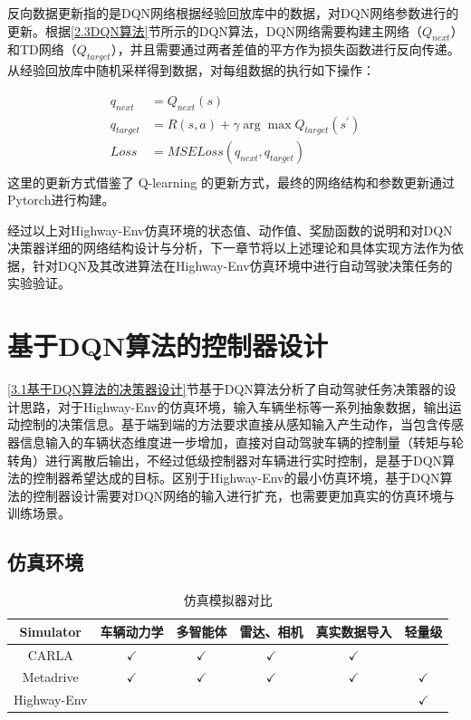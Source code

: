 反向数据更新指的是DQN网络根据经验回放库中的数据，对DQN网络参数进行的更新。根据\ref{2.3DQN算法}节所示的DQN算法，DQN网络需要构建主网络（$Q_{next}$）和TD网络（$Q_{target}$），并且需要通过两者差值的平方作为损失函数进行反向传递。从经验回放库中随机采样得到数据，对每组数据的执行如下操作：

\begin{equation}
    \begin{aligned}
        q_{next} &= Q_{next}(s)\\
        q_{target} &= R(s,a) + \gamma \arg \max Q_{target}(s^{'})\\
        Loss &= MSELoss(q_{next},q_{target})\\
    \end{aligned}
\end{equation}
这里的更新方式借鉴了 Q-learning 的更新方式，最终的网络结构和参数更新通过Pytorch进行构建。

经过以上对Highway-Env仿真环境的状态值、动作值、奖励函数的说明和对DQN决策器详细的网络结构设计与分析，下一章节将以上述理论和具体实现方法作为依据，针对DQN及其改进算法在Highway-Env仿真环境中进行自动驾驶决策任务的实验验证。

\section{基于DQN算法的控制器设计} %

\ref{3.1基于DQN算法的决策器设计}节基于DQN算法分析了自动驾驶任务决策器的设计思路，对于Highway-Env的仿真环境，输入车辆坐标等一系列抽象数据，输出运动控制的决策信息。基于端到端的方法要求直接从感知输入产生动作，当包含传感器信息输入的车辆状态维度进一步增加，直接对自动驾驶车辆的控制量（转矩与轮转角）进行离散后输出，不经过低级控制器对车辆进行实时控制，是基于DQN算法的控制器希望达成的目标。区别于Highway-Env的最小仿真环境，基于DQN算法的控制器设计需要对DQN网络的输入进行扩充，也需要更加真实的仿真环境与训练场景。

\subsection{仿真环境}

\begin{table}[htbp]
    \caption{仿真模拟器对比}\label{仿真模拟器对比}
    \centering
    \renewcommand\arraystretch{1.5}
    \begin{tabular}{|c|c|c|c|c|c|}
    \hline
    Simulator   & 车辆动力学        & 多智能体       & 雷达、相机       & 真实数据导入       & 轻量级          \\ \hline
    CARLA\cite{Dosovitskiy17}       & $\checkmark$ & $\checkmark$ & $\checkmark$ & $\checkmark$ &              \\ \hline
    Metadrive\cite{li2021metadrive}   & $\checkmark$ & $\checkmark$ & $\checkmark$ & $\checkmark$ & $\checkmark$ \\ \hline
    Highway-Env\cite{highway-env} &              &              &              &              & $\checkmark$ \\ \hline
    \end{tabular}
\end{table}

